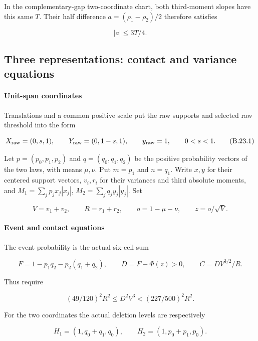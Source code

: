 In the complementary-gap two-coordinate chart, both third-moment slopes have
this same $T$. Their half difference $a=(\rho_1-\rho_2)/2$ therefore satisfies

\[
 \boxed{|a|\le3T/4.}
\tag{B.22.2}\label{contact:unit-span-third-moment slope-2}
\]
\subsection{Three representations: contact and variance equations}\label{contact:three-owner-321-contact-reduction}


\paragraph{Unit-span coordinates}

Translations and a common positive scale put the raw supports and selected
raw threshold into the form

\[
 X_{\rm raw}=(0,s,1),\qquad Y_{\rm raw}=(0,1-s,1),
 \qquad y_{\rm raw}=1,\qquad 0<s<1.
\tag{B.23.1}\label{contact:three-owner-321-contact-reduction-1}
\]

Let $p=(p_0,p_1,p_2)$ and $q=(q_0,q_1,q_2)$ be the positive
probability vectors of the two laws, with means $\mu,\nu$.
Put $m=p_1$ and $n=q_1$. Write
$x,y$ for their centered support vectors, $v_i,r_i$ for their
variances and third absolute moments, and
$M_1=\sum_jp_jx_j|x_j|$, $M_2=\sum_jq_jy_j|y_j|$. Set

\[
 V=v_1+v_2,\qquad R=r_1+r_2,\qquad o=1-\mu-\nu,
 \qquad z=o/\sqrt V.
\tag{B.23.2}\label{contact:three-owner-321-contact-reduction-3}
\]

\paragraph{Event and contact equations}

The event probability is the actual six-cell sum

\[
 F=1-p_1q_2-p_2(q_1+q_2),\qquad D=F-\Phi(z)>0,
 \qquad C=D V^{3/2}/R.
\tag{B.23.3}\label{contact:three-owner-321-contact-reduction-5}
\]

Thus require

\[
 (49/120)^2R^2\le D^2V^3<(227/500)^2R^2.
\tag{B.23.4}\label{contact:three-owner-321-contact-reduction-6}
\]

For the two coordinates the actual deletion levels are respectively

\[
 H_1=(1,q_0+q_1,q_0),\qquad
 H_2=(1,p_0+p_1,p_0).
\tag{B.23.5}\label{contact:three-owner-321-contact-reduction-7}
\]

